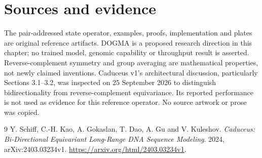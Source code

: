 \section*{Sources and evidence}
The pair-addressed state operator, examples, proofs, implementation and plates
are original reference artifacts. DOGMA is a proposed research direction in
this chapter; no trained model, genomic capability or throughput result is
asserted. Reverse-complement symmetry and group averaging are mathematical
properties, not newly claimed inventions.
Caduceus v1's architectural discussion, particularly Sections 3.1--3.2, was
inspected on 25 September 2026 to distinguish bidirectionality from
reverse-complement equivariance. Its reported performance is not used as
evidence for this reference operator. No source artwork or prose was copied.
\begingroup\let\chapter\section
\begin{thebibliography}{9}
 Y. Schiff, C.-H. Kao, A. Gokaslan, T. Dao, A. Gu and
V. Kuleshov. \emph{Caduceus: Bi-Directional Equivariant Long-Range DNA
Sequence Modeling}. 2024, arXiv:2403.03234v1.
\url{https://arxiv.org/html/2403.03234v1}.
\end{thebibliography}\endgroup
